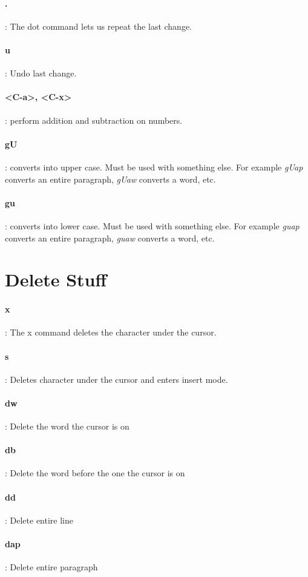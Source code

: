 \documentclass[10pt,letterpaper]{book}
\begin{document}
\paragraph{.}: The dot command lets us repeat the last change.
\paragraph{u}: Undo last change.
\paragraph{<C-a>, <C-x>}: perform addition and subtraction on numbers.
\paragraph{gU}: converts into upper case. Must be used with something else. For example \textit{gUap} converts an entire paragraph, \textit{gUaw} converts a word, etc.
\paragraph{gu}: converts into lower case. Must be used with something else. For example \textit{guap} converts an entire paragraph, \textit{guaw} converts a word, etc.
\section{Delete Stuff}
\paragraph{x}: The x command deletes the character under the cursor.
\paragraph{s}: Deletes character under the cursor and enters insert mode.
\paragraph{dw}: Delete the word the cursor is on
\paragraph{db}: Delete the word before the one the cursor is on
\paragraph{dd}: Delete entire line
\paragraph{dap}: Delete entire paragraph
\end{document}
